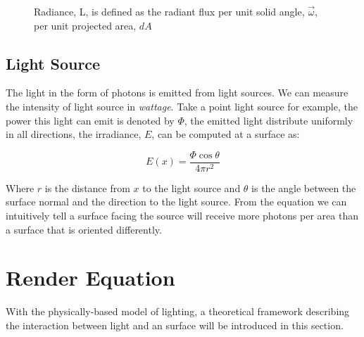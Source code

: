\begin{figure}[htp] 
    \centering 
    \renewcommand{\thefigure}{\thechapter.\arabic{figure}}
    \caption[]{Radiance, L, is defined as the radiant flux per unit solid angle, \(\overrightarrow{\omega}\), per unit projected area, \(dA\)}
    \label{fig:radiance_solid_angle} 
\end{figure} 

\subsection{Light Source}
The light in the form of photons is emitted from light sources. We can measure the intensity of light source in \emph{wattage}. Take a point light source for example, the power this light can emit is denoted by \(\Phi\), the emitted light distribute uniformly in all directions, the irradiance, \(E\), can be computed at a surface as: 

\begin{equation}
E(x) = \frac{\Phi \cos{\theta}}{4\pi r^{2}} 
\end{equation}

Where \(r\) is the distance from \(x\) to the light source and \(\theta\) is the angle between the surface normal and the direction to the light source. From the equation we can intuitively tell a surface facing the source will receive more photons per area than a surface that is oriented differently.   


\section{Render Equation}
With the physically-based model of lighting, a theoretical framework describing the interaction between light and an surface will be introduced in this section. 

